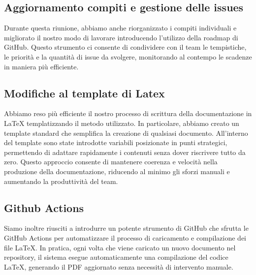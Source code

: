 \documentclass{article}
\begin{document}
\subsection{Aggiornamento compiti e gestione delle issues}
Durante questa riunione, abbiamo anche riorganizzato i compiti individuali e migliorato il nostro modo di lavorare introducendo l'utilizzo della roadmap di GitHub. Questo strumento ci consente di condividere con il team le tempistiche, le priorità e la quantità di issue da svolgere, monitorando al contempo le scadenze in maniera più efficiente.



\subsection{Modifiche al template di Latex}
Abbiamo reso più efficiente il nostro processo di scrittura della documentazione in LaTeX templatizzando il metodo utilizzato. In particolare, abbiamo creato un template standard che semplifica la creazione di qualsiasi documento. All'interno del template sono state introdotte variabili posizionate in punti strategici, permettendo di adattare rapidamente i contenuti senza dover riscrivere tutto da zero. Questo approccio consente di mantenere coerenza e velocità nella produzione della documentazione, riducendo al minimo gli sforzi manuali e aumentando la produttività del team.

\subsection{Github Actions}
Siamo inoltre riusciti a introdurre un potente strumento di GitHub che sfrutta le GitHub Actions per automatizzare il processo di caricamento e compilazione dei file LaTeX. In pratica, ogni volta che viene caricato un nuovo documento nel repository, il sistema esegue automaticamente una compilazione del codice LaTeX, generando il PDF aggiornato senza necessità di intervento manuale.
\end{document}
